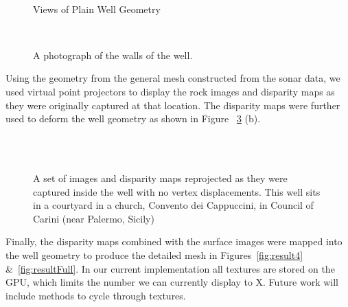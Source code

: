 \documentclass[twocolumn]{article}
\begin{document}
\begin{figure}[!h]
	\centering
		\quad %
		\\%

		\caption{Views of Plain Well Geometry}
		\label{fig:wellNoFine}
\end{figure}

\begin{figure}[!h]
	\centering
		\\%

		\caption{ A photograph of the walls of the well.}
		\label{fig:wellPhoto}
\end{figure}

Using the geometry from the general mesh constructed from the sonar data, we used virtual point projectors to display the rock images and disparity maps as they were originally captured at that location.  
The disparity maps were further used to deform the well geometry as shown in Figure ~\ref{fig:result2} (b).

\begin{figure}[!h]
	\centering
		\\
		\quad %
		\\		
		\caption{A set of images and disparity maps reprojected as they were captured inside the well with no vertex displacements. This well sits in a courtyard in a church, Convento dei Cappuccini, in Council of Carini (near Palermo, Sicily)}
		\label{fig:result2}
\end{figure}


Finally, the disparity maps combined with the surface images were mapped into the well geometry to produce the detailed mesh in Figures~\ref{fig:result4} \&~\ref{fig:resultFull}. In our current implementation all textures are stored on the GPU, which limits the number we can currently display to X. Future work will include methods to cycle through textures.
\end{document}
